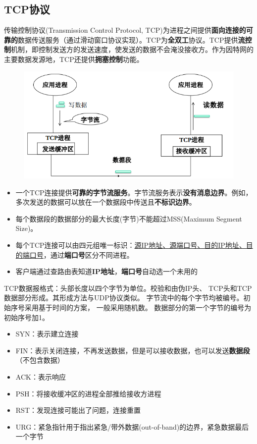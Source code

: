 \subsection{TCP协议}
传输控制协议(Transmission Control Protocol, TCP)为进程之间提供\textbf{面向连接的可靠的}数据传送服务（通过滑动窗口协议实现）。TCP为\textbf{全双工}协议。TCP提供\textbf{流控制}机制，即控制发送方的发送速度，使发送的数据不会淹没接收方。作为因特网的主要数据发源地，TCP还提供\textbf{拥塞控制}功能。
\begin{figure}[H]
    \centering
    \includegraphics[width=0.5\linewidth]{fig/TCP.PNG}
\end{figure}

\begin{itemize}
\item 一个TCP连接提供\textbf{可靠的字节流服务}。字节流服务表示\textbf{没有消息边界}。例如，多次发送的数据可以放在一个数据段中传送且\textbf{不标识边界}。
\item 每个数据段的数据部分的最大长度(字节)不能超过MSS(Maximum Segment Size)。
\item 每个TCP连接可以由四元组唯一标识：\underline{源IP地址、源端口号、目的IP地址、目的端口号}，通过\textbf{端口号}区分不同进程。
\item 客户端通过查路由表知道\textbf{IP地址}，\textbf{端口号}自动选一个未用的
\end{itemize}

TCP数据报格式：头部长度以四个字节为单位。校验和由伪IP头、 TCP头和TCP数据部分形成。其形成方法与UDP协议类似。
字节流中的每个字节均被编号。初始序号采用基于时间的方案， 一般采用随机数。
数据部分的第一个字节的编号为初始序号加1。
\begin{itemize}
\item SYN：表示建立连接
\item FIN：表示关闭连接，不再发送数据，但是可以接收数据，也可以发送\textbf{数据段}（不包含数据）
\item ACK：表示响应
\item PSH：将接收缓冲区的进程全部推给接收方进程
\item RST：发现连接可能出了问题，连接重置
\item URG：紧急指针用于指出紧急/带外数据(out-of-band)的边界，紧急数据最后一个字节
\end{itemize}

